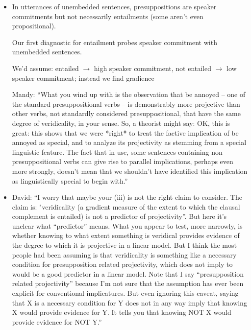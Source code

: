 \documentclass[11pt,fleqn]{article}
\newcommand{\6}{\mbox{$[\hspace*{-.6mm}[$}}
\newcommand{\9}{\mbox{$]\hspace*{-.6mm}]$}}
\begin{document}
\begin{itemize}
\begin{itemize}
\item In utterances of unembedded sentences, presuppositions are speaker commitments but not necessarily entailments (some aren't even propositional).

Our first diagnostic for entailment probes speaker commitment with unembedded sentences.

We'd assume: entailed $\rightarrow$ high speaker commitment, not entailed $\rightarrow$ low speaker commitment; instead we find gradience

Mandy: ``What you wind up with is the observation that be annoyed -- one of the standard presuppositional verbs -- is demonstrably more projective than other verbs, not standardly considered presuppositional, that have the same degree of veridicality, in your sense. So, a theorist might say: OK, this is great: this shows that we were *right* to treat the factive implication of be annoyed as special, and to analyze its projectivity as stemming from a special linguistic feature. The fact that in use, some sentences containing non-presuppositional verbs can give rise to parallel implications, perhaps even more strongly, doesn't mean that we shouldn't have identified this implication as linguistically special to begin with.''

\item David: ``I worry that maybe your (iii) is not the right claim to consider. The claim is: "veridicality (a gradient measure of the extent to which the clausal complement is entailed) is not a predictor of projectivity”. But here it’s unclear what “predictor” means. What you appear to test, more narrowly, is whether knowing to what extent something is veridical provides evidence of the degree to which it is projective in a linear model. But I think the most people had been assuming is that veridicality is something like a necessary condition for presupposition related projectivity, which does not imply to would be a good predictor in a linear model. Note that I say “presupposition related projectivity” because I’m not sure that the assumption has ever been explicit for conventional implicatures. But even ignoring this caveat, saying that X is a necessary condition for Y does not in any way imply that knowing X would provide evidence for Y. It tells you that knowing NOT X would provide evidence for NOT Y.''


\end{itemize}
\end{itemize}
\end{document}
